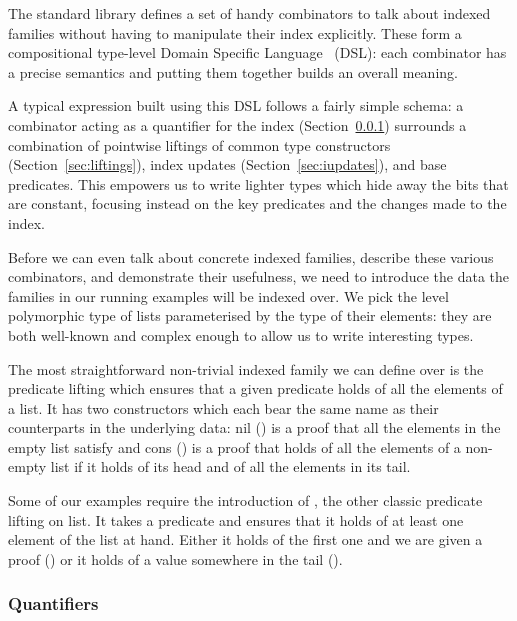 The standard library defines a set of handy combinators to talk about
indexed families without having to manipulate their index explicitly.
These form a compositional type-level Domain Specific
Language~\cite{DBLP:journals/csur/Hudak96} (DSL):
each combinator has a precise semantics and putting them together builds
an overall meaning.

A typical expression built using this DSL follows a fairly simple schema:
a combinator acting as a quantifier for the index (Section~\ref{sec:quantifiers})
surrounds a combination of pointwise liftings of common type constructors
(Section~\ref{sec:liftings}), index updates (Section~\ref{sec:iupdates}),
and base predicates. This empowers us to write lighter types which hide
away the bits that are constant, focusing instead on the key predicates
and the changes made to the index.

Before we can even talk about concrete indexed families, describe these
various combinators, and demonstrate their usefulness, we need to
introduce the data the families in our running examples will be indexed
over. We pick  the level polymorphic type of lists parameterised
by the type of their elements: they are both well-known and complex enough
to allow us to write interesting types.


The most straightforward non-trivial indexed family we can define over
 is the predicate lifting  which ensures that a given
predicate  holds of all the elements of a list. It has two
constructors which each bear the same name as their counterparts in the
underlying data: nil (\AIC{[]}) is a proof that all the elements in the
empty list satisfy  and cons (\AIC{\_::\_}) is a proof that 
holds of all the elements of a non-empty list if it holds of its head
and of all the elements in its tail.


Some of our examples require the introduction of , the other classic
predicate lifting on list. It takes a predicate and ensures that it holds of
at least one element of the list at hand. Either it holds of the first one
and we are given a proof () or it holds of a value somewhere in the
tail ().


\subsubsection{Quantifiers}\label{sec:quantifiers}

